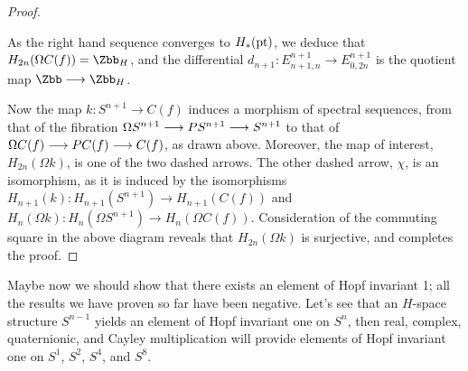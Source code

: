 \begin{proof}
\begin{center}
\end{center}
As the right hand sequence converges to $H_*(\mathrm{pt})$, we deduce that $H_{2n}(\Omega C(f))=\Zbb_H$, and the differential $d_{n+1}:E^{n+1}_{n+1,n}\to E^{n+1}_{0,2n}$ is the quotient map $\Zbb\to\Zbb_H$.

Now the map $k:S^{n+1}\to C(f)$ induces a morphism of spectral sequences,  from that of the fibration $\Omega S^{n+1} \longrightarrow PS^{n+1} \longrightarrow S^{n+1}$ to that of $\Omega C(f) \longrightarrow PC(f) \longrightarrow C(f)$, as drawn above. Moreover, the map of interest, $H_{2n}(\Omega k)$, is one of the two dashed arrows. The other dashed arrow, $\chi$, is an isomorphism, as it is induced by the isomorphisms $H_{n+1}(k):H_{n+1}(S^{n+1})\to H_{n+1}(C(f))$ and $H_{n}(\Omega k):H_n(\Omega S^{n+1})\to H_n(\Omega C(f))$. Consideration of the commuting square in the above diagram reveals that $H_{2n}(\Omega k)$ is surjective, and completes the proof.
\end{proof}

Maybe now we should show that there exists an element of Hopf invariant 1; all the results we have proven so far have been negative.  Let's see that an $H$-space structure $S^{n-1}$ yields an element of Hopf invariant one on $S^n$, then real, complex, quaternionic, and Cayley multiplication will provide elements of Hopf invariant one on $S^1$, $S^2$, $S^4$, and $S^8$.

